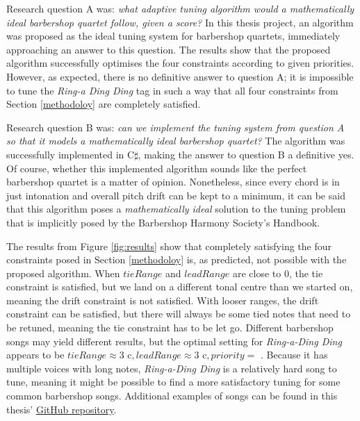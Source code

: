 \documentclass[a4paper]{article}
\begin{document}
Research question A was: {\it what adaptive tuning algorithm would a mathematically ideal barbershop quartet follow, given a score?} In this thesis project, an algorithm was proposed as the ideal tuning system for barbershop quartets, immediately approaching an answer to this question. The results show that the proposed algorithm successfully optimises the four constraints according to given priorities. However, as expected, there is no definitive answer to question A; it is impossible to tune the \textit{Ring-a Ding Ding} tag in such a way that all four constraints from Section \ref{methodoloy} are completely satisfied. 

Research question B was: {\it can we implement the tuning system from question A so that it models a mathematically ideal barbershop quartet?} The algorithm was successfully implemented in C$\sharp$, making the answer to question B a definitive yes. Of course, whether this implemented algorithm sounds like the perfect barbershop quartet is a matter of opinion. Nonetheless, since every chord is in just intonation and overall pitch drift can be kept to a minimum, it can be said that this algorithm poses a \textit{mathematically ideal} solution to the tuning problem that is implicitly posed by the Barbershop Harmony Society's Handbook. \cite{barbershop_harmony_society_contest_2022}

The results from Figure \ref{fig:results} show that completely satisfying the four constraints posed in Section \ref{methodoloy} is, as predicted, not possible with the proposed algorithm. When $\mathit{tieRange}$ and $\mathit{leadRange}$ are close to 0, the tie constraint is satisfied, but we land on a different tonal centre than we started on, meaning the drift constraint is not satisfied. With looser ranges, the drift constraint can be satisfied, but there will always be some tied notes that need to be retuned, meaning the tie constraint has to be let go. Different barbershop songs may yield different results, but the optimal setting for \textit{Ring-a-Ding Ding} appears to be $\mathit{tieRange} \approx 3\text{ c}, \mathit{leadRange} \approx 3\text{ c}, \mathit{priority} = $ . Because it has multiple voices with long notes, \textit{Ring-a-Ding Ding} is a relatively hard song to tune, meaning it might be possible to find a more satisfactory tuning for some common barbershop songs. Additional examples of songs can be found in this thesis' \href{https://github.com/teuncb/adaptivebarbershop}{GitHub repository}.
\end{document}
